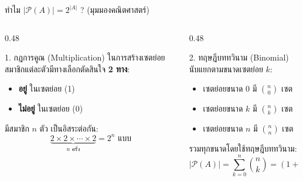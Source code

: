 \begin{frame}{ทำไม $|\mathcal{P}(A)| = 2^{|A|}$ ? (มุมมองคณิตศาสตร์)}
  \begin{columns}[T]
    \begin{column}{0.48\textwidth}
      \begin{block}{1. กฎการคูณ (Multiplication)}
        ในการสร้างเซตย่อย สมาชิกแต่ละตัวมีทางเลือกตัดสินใจ \textbf{2 ทาง}:
        \begin{itemize}
          \item \textbf{อยู่} ในเซตย่อย (1)
          \item \textbf{ไม่อยู่} ในเซตย่อย (0)
        \end{itemize}
        มีสมาชิก $n$ ตัว เป็นอิสระต่อกัน:
        \[ \underbrace{2 \times 2 \times \cdots \times 2}_{n \text{ ครั้ง}} = 2^n \text{ แบบ} \]
      \end{block}
    \end{column}
    \begin{column}{0.48\textwidth}
      \begin{block}{2. ทฤษฎีบททวินาม (Binomial)}
        นับแยกตามขนาดเซตย่อย $k$:
        \begin{itemize}\small
          \item เซตย่อยขนาด $0$ มี $\binom{n}{0}$ เซต
          \item เซตย่อยขนาด $k$ มี $\binom{n}{k}$ เซต
          \item เซตย่อยขนาด $n$ มี $\binom{n}{n}$ เซต
        \end{itemize}
        รวมทุกขนาดโดยใช้ทฤษฎีบททวินาม:
        \[ |\mathcal{P}(A)| = \sum_{k=0}^n \binom{n}{k} = (1+1)^n = 2^n \]
      \end{block}
    \end{column}
  \end{columns}
\end{frame}

